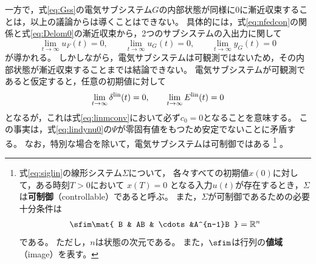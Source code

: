 \documentclass[tombow,dvipdfmx]{corona-a5-1.1}
\begin{document}
一方で，式\ref{eq:Gss}の電気サブシステム$G$の内部状態が同様に0に漸近収束することは，以上の議論からは導くことはできない。
具体的には，式\ref{eq:nfedcon}の関係と式\ref{eq:Delom0}の漸近収束から，2つのサブシステムの入出力に関して
\[
\lim_{t\rightarrow \infty} u_F(t)  =0,\qquad
\lim_{t\rightarrow \infty} u_G(t)  =0,\qquad
\lim_{t\rightarrow \infty} y_G(t)  =0
\]
が導かれる。
しかしながら，電気サブシステムは可観測ではないため，その内部状態が漸近収束することまでは結論できない。
電気サブシステムが可観測であると仮定すると，任意の初期値に対して
\[
\lim_{t\rightarrow \infty}  \delta^{\rm lin}(t)  =0,\qquad
\lim_{t\rightarrow \infty}  E^{\rm lin}(t)  =0
\]
となるが，これは式\ref{eq:linmconv}において必ず$c_0=0$となることを意味する。
この事実は，式\ref{eq:lindynu0}の$\Psi$が零固有値をもつため安定でないことに矛盾する。
なお，特別な場合を除いて，電気サブシステムは可制御ではある
\footnote{
式\ref{eq:siglin}の線形システム$\Sigma$について，
各々すべての初期値$x(0)$に対して，ある時刻$T > 0$において $x(T) = 0$ となる入力$u(t)$が存在するとき，$\Sigma$は\textbf{可制御}（controllable）であると呼ぶ。
また，$\Sigma$が可制御であるための必要十分条件は
\[
\sfim \mat{
B & AB & \cdots &A^{n-1}B
}
= \mathbb{R}^n
\]
である。
ただし，$n$は状態の次元である。
また，$\sfim$は行列の\textbf{値域}（image）を表す。
}
。
\end{document}
